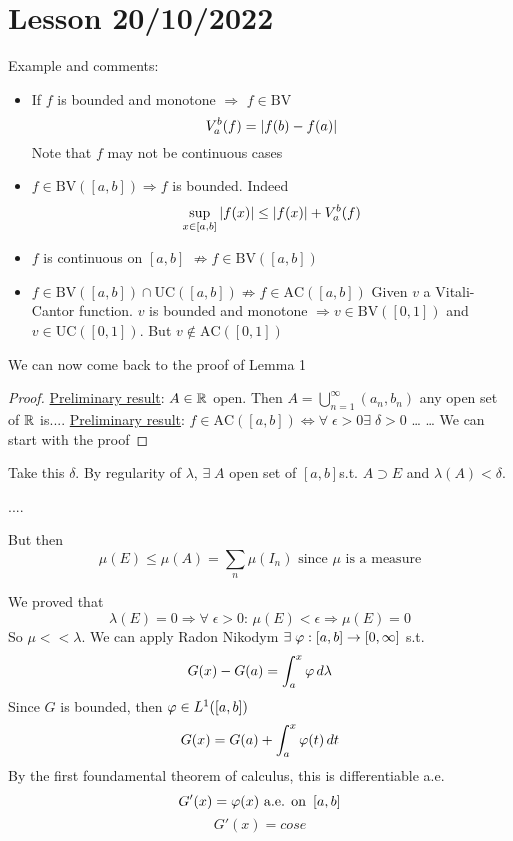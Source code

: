 \section{Lesson 20/10/2022}
Example and comments:
\begin{itemize}
    \item If \(f\) is bounded and monotone \(\Longrightarrow\) \(f \in \mbox{BV}\)
    \[
        V_a^b (f) = \abs{f(b) - f(a)}
    \]
    Note that \(f\) may not be continuous
    cases
    \item \(f \in \mbox{BV}([a,b]) \Longrightarrow f\) is bounded. Indeed
    \[
        \sup_{x \in [a,b]} \abs{f(x)} \leq \abs{f(x)} + V_a^b(f)
    \]
    \item \(f\) is continuous on \([a,b]\) \(\not\Longrightarrow f \in \mbox{BV}([a,b])\)
    \item \(f \in \mbox{BV}([a,b]) \cap \mbox{UC}([a,b]) \not \Longrightarrow f \in \mbox{AC}([a,b])\)
    Given \(v\) a Vitali-Cantor function. \(v\) is bounded and monotone \(\Longrightarrow v \in \mbox{BV}([0,1])\) and \(v \in \mbox{UC}([0,1])\). But \(v \not \in \mbox{AC}([0,1])\)
\end{itemize}
We can now come back to the proof of Lemma 1
\begin{proof}
    \underline{Preliminary result}: \(A \in \mathbb{R}\) open. Then \(A = \bigcup_{n=1}^{\infty}(a_n, b_n)\)
    any open set of \(\mathbb{R}\) is....
    \underline{Preliminary result}: \(f \in \mbox{AC}([a,b]) \Longleftrightarrow \forall \; \epsilon > 0 \exists \; \delta > 0\)
    \dots
    \dots
    We can start with the proof
\end{proof}

Take this \(\delta\). By regularity of \(\lambda\), \(\exists \; A \) open set of \(\left[a, b\right]\)s.t. \(A \supset E\) and \(\lambda(A) < \delta\). 

....

But then 
\[
    \mu (E) \leq \mu(A) = \sum_n \mu (I_n) \text{ since } \mu \text{ is a measure}
\]

We proved that 
\[
    \lambda(E) = 0 \Rightarrow \forall \; \epsilon >0 : \, \mu(E) < \epsilon \Rightarrow \mu(E) =0
\]
So \(\mu << \lambda\). We can apply Radon Nikodym \(\exists \; \oldphi : \left[ a, b\right] \to \left[0, \infty\right]\) s.t. 
\[
    G(x) - G(a) = \int_a^x \oldphi \, d\lambda
\]
Since \(G\) is bounded, then \(\oldphi \in L^1(\left[a, b\right])\)
\[
    G(x)=G(a) + \int_a^x \oldphi(t) \, dt
\]
By the first foundamental theorem of calculus, this is differentiable a.e. 
\[
    G'(x) = \oldphi(x) \text{ a.e. on } \left[a, b\right]
\]
\[
    G'(x) = cose
\]

